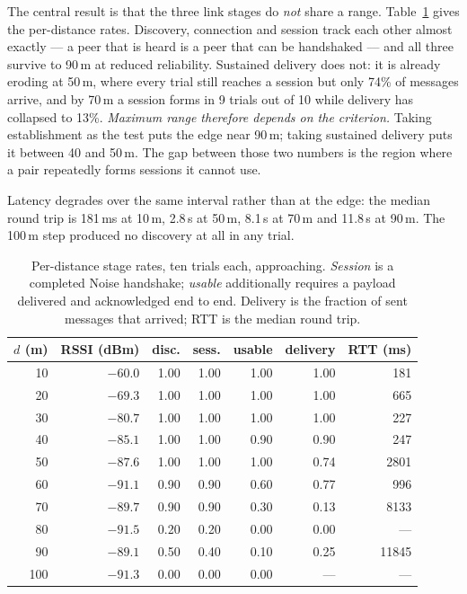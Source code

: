 The central result is that the three link stages do \emph{not} share a range.
Table~\ref{tab:line-stages} gives the per-distance rates. Discovery, connection
and session track each other almost exactly --- a peer that is heard is a peer
that can be handshaked --- and all three survive to 90\,m at reduced
reliability. Sustained delivery does not: it is already eroding at 50\,m, where
every trial still reaches a session but only 74\% of messages arrive, and by
70\,m a session forms in 9 trials out of 10 while delivery has collapsed to
13\%. \emph{Maximum range therefore depends on the criterion.} Taking
establishment as the test puts the edge near 90\,m; taking sustained delivery
puts it between 40 and 50\,m. The gap between those two numbers is the region
where a pair repeatedly forms sessions it cannot use.

Latency degrades over the same interval rather than at the edge: the median
round trip is 181\,ms at 10\,m, 2.8\,s at 50\,m, 8.1\,s at 70\,m and 11.8\,s at
90\,m. The 100\,m step produced no discovery at all in any trial.

\begin{table}[t]
  \centering
  \small
  \caption[Link stage rates against distance]{%
    Per-distance stage rates, ten trials each, approaching. \emph{Session} is a
    completed Noise handshake; \emph{usable} additionally requires a payload
    delivered and acknowledged end to end. Delivery is the fraction of sent
    messages that arrived; RTT is the median round trip.}
  \label{tab:line-stages}
  \begin{tabular}{@{}rrrrrrr@{}}
    \toprule
    $d$ (m) & RSSI (dBm) & disc. & sess. & usable & delivery & RTT (ms) \\
    \midrule
    10  & $-60.0$ & 1.00 & 1.00 & 1.00 & 1.00 & 181 \\
    20  & $-69.3$ & 1.00 & 1.00 & 1.00 & 1.00 & 665 \\
    30  & $-80.7$ & 1.00 & 1.00 & 1.00 & 1.00 & 227 \\
    40  & $-85.1$ & 1.00 & 1.00 & 0.90 & 0.90 & 247 \\
    50  & $-87.6$ & 1.00 & 1.00 & 1.00 & 0.74 & 2801 \\
    60  & $-91.1$ & 0.90 & 0.90 & 0.60 & 0.77 & 996 \\
    70  & $-89.7$ & 0.90 & 0.90 & 0.30 & 0.13 & 8133 \\
    80  & $-91.5$ & 0.20 & 0.20 & 0.00 & 0.00 & --- \\
    90  & $-89.1$ & 0.50 & 0.40 & 0.10 & 0.25 & 11845 \\
    100 & $-91.3$ & 0.00 & 0.00 & 0.00 & --- & --- \\
    \bottomrule
  \end{tabular}
\end{table}

